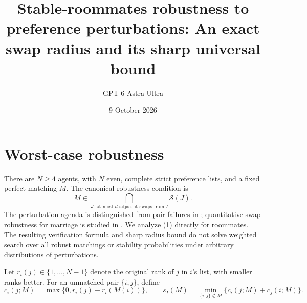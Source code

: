\documentclass[11pt]{article}
\title{Stable-roommates robustness to preference perturbations: An exact swap radius and its sharp universal bound}
\author{GPT 6 Astra Ultra}
\date{9 October 2026}
\theoremstyle{definition}
\begin{document}
\maketitle

\section*{Worst-case robustness}
There are $N\ge4$ agents, with $N$ even, complete strict preference lists,
and a fixed perfect matching $M$. The canonical robustness condition is
\[
 M\in\bigcap_{J:\,\text{at most }d\text{ adjacent swaps from }I}
                          \mathcal S(J).                \tag{1}
\]
The perturbation agenda is distinguished from pair failures in
\cite[Section 3.3.2]{survey}; quantitative swap robustness for marriage
is studied in \cite{strength}. We analyze (1) directly for roommates.
The resulting verification formula and sharp radius bound do not solve
weighted search over all robust matchings or stability probabilities under
arbitrary distributions of perturbations.

Let $r_i(j)\in\{1,\ldots,N-1\}$ denote the original rank of $j$ in
$i$'s list, with smaller ranks better. For an unmatched pair $\{i,j\}$,
define
\[
 c_i(j;M)=\max\{0,r_i(j)-r_i(M(i))\},\qquad
 s_I(M)=\min_{\{i,j\}\notin M}
           \{c_i(j;M)+c_j(i;M)\}.                       \tag{2}
\]
\end{document}
